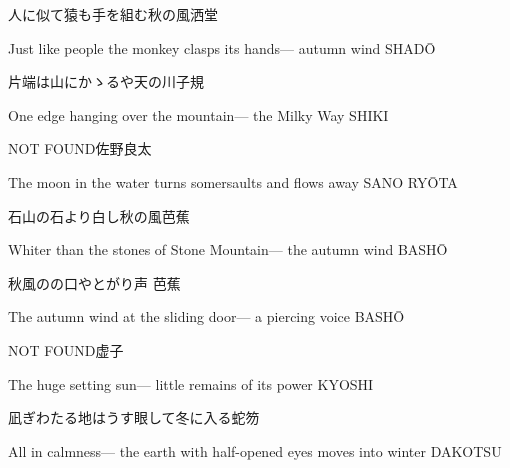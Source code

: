 \begin{haiku}
    {\FH 人に似て猿も手を組む秋の風}\hfill{\FH 洒堂}

    \vin{} Just like people
    \vin{} \vin{} the monkey clasps its hands---
    \vin{} \vin{} \vin{} autumn wind \hspace{\fill} SHAD\={O}
\end{haiku}

\begin{haiku}
    {\FH 片端は山にかゝるや天の川}\hfill{\FH 子規}

    \vin{} One edge
    \vin{} \vin{} hanging over the mountain---
    \vin{} \vin{} \vin{} the Milky Way \hspace{\fill} SHIKI
\end{haiku}

\begin{haiku}
    {NOT FOUND}\hfill{\FH 佐野良太}

    \vin{} The moon in the water
    \vin{} \vin{} turns somersaults
    \vin{} \vin{} \vin{} and flows away \hspace{\fill} SANO RY\={O}TA
\end{haiku}

\begin{haiku}
    {\FH 石山の石より白し秋の風}\hfill{\FH 芭蕉}

    \vin{} Whiter than
    \vin{} \vin{} the stones of Stone Mountain---
    \vin{} \vin{} \vin{} the autumn wind \hspace{\fill} BASH\={O}
\end{haiku}

\begin{haiku}
    {\FH 秋風のの口やとがり声 }\hfill{\FH 芭蕉}

    \vin{} The autumn wind
    \vin{} \vin{} at the sliding door---
    \vin{} \vin{} \vin{} a piercing voice \hspace{\fill} BASH\={O}
\end{haiku}

\begin{haiku}
    {NOT FOUND}\hfill{\FH 虚子}

    \vin{} The huge setting sun---
    \vin{} \vin{} little remains of
    \vin{} \vin{} \vin{} its power \hspace{\fill} KYOSHI
\end{haiku}

\begin{haiku}
    {\FH 凪ぎわたる地はうす眼して冬に入る}\hfill{\FH 蛇笏}

    \vin{} All in calmness---
    \vin{} \vin{} the earth with half-opened eyes
    \vin{} \vin{} \vin{} moves into winter \hspace{\fill} DAKOTSU
\end{haiku}

